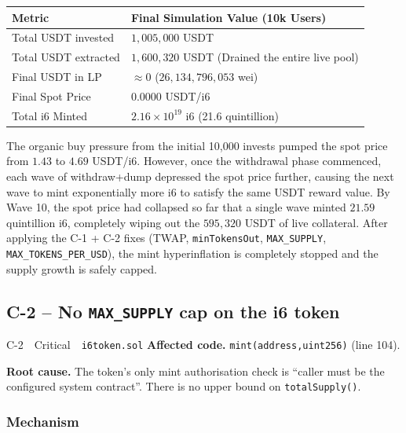 \documentclass[11pt,a4paper]{article}
\begin{document}
\begin{center}
\renewcommand{\arraystretch}{1.3}
\begin{tabular}{p{4.5cm} p{8.5cm}}
\toprule
\textbf{Metric} & \textbf{Final Simulation Value (10k Users)} \\
\midrule
Total USDT invested & $1{,}005{,}000$ USDT \\
Total USDT extracted & $1{,}600{,}320$ USDT (Drained the entire live pool) \\
Final USDT in LP & $\approx 0$ ($26{,}134{,}796{,}053$ wei) \\
Final Spot Price & $0.0000$ USDT/i6 \\
Total i6 Minted & $2.16 \times 10^{19}$ i6 (21.6 quintillion) \\
\bottomrule
\end{tabular}
\end{center}

\noindent
The organic buy pressure from the initial 10,000 invests pumped the spot price from $1.43$ to $4.69$ USDT/i6. However, once the withdrawal phase commenced, each wave of withdraw+dump depressed the spot price further, causing the next wave to mint exponentially more i6 to satisfy the same USDT reward value. By Wave 10, the spot price had collapsed so far that a single wave minted $21.59$ quintillion i6, completely wiping out the $595{,}320$ USDT of live collateral. 
After applying the C-1 + C-2 fixes (TWAP, \texttt{minTokensOut}, \texttt{MAX\_SUPPLY},
\texttt{MAX\_TOKENS\_PER\_USD}), the mint hyperinflation is completely stopped and the supply growth is safely capped.

\subsection{C-2 -- No \texttt{MAX\_SUPPLY} cap on the i6 token}

\begin{criticalbox}{C-2 \,\textbar\, Critical \,\textbar\, \texttt{i6token.sol}}
\textbf{Affected code.} \texttt{mint(address,uint256)} (line 104).

\textbf{Root cause.} The token's only mint authorisation check is
``caller must be the configured system contract''. There is no upper
bound on \texttt{totalSupply()}.
\end{criticalbox}

\subsubsection*{Mechanism}
\end{document}
